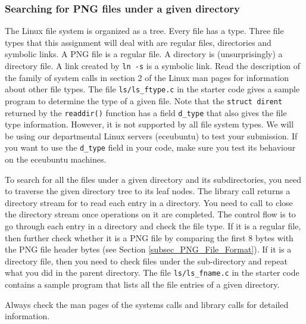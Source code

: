 \subsubsection{Searching for PNG files under a given directory}
The Linux file system is organized as a tree. Every file has a type. Three file types that this assignment will deal with are regular files, directories and symbolic links.  A PNG file is a regular file. A directory is (unsurprisingly) a directory file. A link created by \verb+ln -s+ is a symbolic link. Read the description of the  family of system calls in section 2 of the Linux man pages for information about other file types. The file \verb+ls/ls_ftype.c+ in the starter code gives a sample program to determine the type of a given file. Note that the \verb+struct dirent+ returned by the \verb+readdir()+ function has a field \verb+d_type+ that also gives the file type information. However, it is not supported by all file system types. We will be using our departmental Linux servers (eceubuntu) to test your submission. If you want to use the \verb+d_type+ field in your code, make sure you test its behaviour on the eceubuntu machines.

To search for all the files under a given directory and its subdirectories, you need to traverse the given directory tree to its leaf nodes.  The library call  returns a directory stream for  to read each entry in a directory. You need to call  to close the directory stream once operations on it are completed. The control flow is to go through each entry in a directory and check the file type. If it is a regular file, then further check whether it is a PNG file by comparing the first 8 bytes with the PNG file header bytes (see Section \ref{subsec_PNG_File_Format}). If it is a directory file, then you need to check files under the sub-directory and repeat what you did in the parent directory.
The file \verb+ls/ls_fname.c+ in the starter code contains a sample program that lists all the file entries of a given directory.

Always check the man pages of the systems calls and library calls for detailed information.
